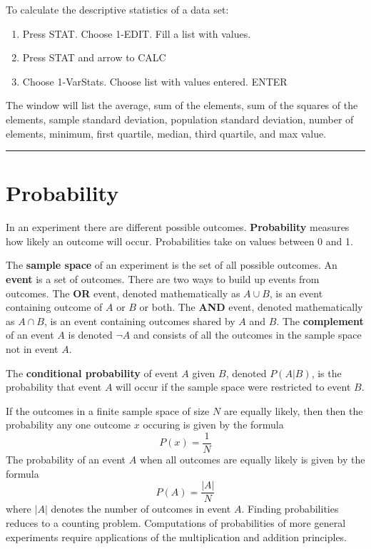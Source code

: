 \documentclass{article}
\theoremstyle{definition}
\newcommand{\secend}[0]{\noindent\rule[0.5ex]{\linewidth}{1pt}}
\begin{document}
\begin{tcolorbox}
    To calculate the descriptive statistics of a data set:
    \begin{enumerate}
        \item Press STAT. Choose 1-EDIT. Fill a list with values. 
        \item Press STAT and arrow to CALC
        \item Choose 1-VarStats. Choose list with values entered. ENTER 
    \end{enumerate}
    The window will list the average, sum of the elements, sum of the
    squares of the elements, sample standard deviation, population standard
    deviation, number of elements, minimum, first quartile, median, third
    quartile, and max value.
\end{tcolorbox}

\secend

\section*{Probability}
\begin{definition}
    In an experiment there are different possible outcomes. \textbf{Probability}
    measures how likely an outcome will occur. Probabilities take on values
    between 0 and 1.
\end{definition}

\noindent The \textbf{sample space} of an experiment is the set of all possible 
outcomes. An \textbf{event} is a set of outcomes. There are two ways to build up 
events from outcomes. The \textbf{OR} event, denoted mathematically as 
$A \cup B$, is an event containing outcome of $A$ or $B$ or both. The \textbf{AND}
event, denoted mathematically as $A \cap B$, is an event containing outcomes shared
by $A$ and $B$. The \textbf{complement} of an event $A$ is denoted $\neg A$ and 
consists of all the outcomes in the sample space not in event $A$.

\begin{definition}
    The \textbf{conditional probability} of event $A$ given $B$, denoted 
    $P(A|B)$, is the probability that event $A$ will occur if the sample space
    were restricted to event $B$.
\end{definition}

\noindent If the outcomes in a finite sample space of size $N$ are equally 
likely, then then the probability any one outcome $x$ occuring is given by the 
formula
\[
    P(x) = \frac{1}{N}
\]
The probability of an event $A$ when all outcomes are equally likely is given by
the formula
\[
    P(A) = \frac{|A|}{N}
\]
where $|A|$ denotes the number of outcomes in event $A$. Finding probabilities
reduces to a counting problem. Computations of probabilities of more general
experiments require applications of the multiplication and addition principles.
\end{document}

